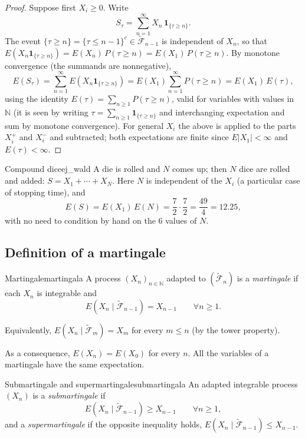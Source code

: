 \documentclass[11pt, a4paper]{article}
\begin{document}
\begin{proof}
Suppose first $X_i \ge 0$. Write
$$ S_\tau = \sum_{n=1}^\infty X_n \, \mathbf{1}_{\{\tau \ge n\}}. $$
The event $\{\tau \ge n\} = \{\tau \le n - 1\}^c \in \widetilde{\mathcal{F}}_{n-1}$ is
independent of $X_n$, so that
$E(X_n \mathbf{1}_{\{\tau \ge n\}}) = E(X_n) \, P(\tau \ge n) = E(X_1) \, P(\tau \ge n)$. By
monotone convergence (the summands are nonnegative),
$$ E(S_\tau) = \sum_{n=1}^\infty E(X_n \mathbf{1}_{\{\tau \ge n\}}) = E(X_1)
\sum_{n=1}^\infty P(\tau \ge n) = E(X_1) \, E(\tau), $$
using the identity $E(\tau) = \sum_{n \ge 1} P(\tau \ge n)$, valid for variables with values
in $\mathbb{N}$ (it is seen by writing $\tau = \sum_{n \ge 1} \mathbf{1}_{\{\tau \ge n\}}$ and
interchanging expectation and sum by monotone convergence). For general $X_i$ the above is applied
to the parts $X_i^+$ and $X_i^-$ and subtracted; both expectations are finite since
$E|X_1| < \infty$ and $E(\tau) < \infty$.
\end{proof}

\begin{ejemplo}{Compound dice}{ej_wald}
A die is rolled and $N$ comes up; then $N$ dice are rolled and added: $S = X_1 + \cdots + X_N$. Here
$N$ is independent of the $X_i$ (a particular case of stopping time), and
$$ E(S) = E(X_1) \, E(N) = \frac{7}{2} \cdot \frac{7}{2} = \frac{49}{4} = 12.25, $$
with no need to condition by hand on the $6$ values of $N$.
\end{ejemplo}

\subsection{Definition of a martingale}

\begin{definicion}{Martingale}{martingala}
A process $(X_n)_{n \in \mathbb{N}}$ adapted to $(\widetilde{\mathcal{F}}_n)$ is a
\emph{martingale} if each $X_n$ is integrable and
$$ E(X_n \mid \widetilde{\mathcal{F}}_{n-1}) = X_{n-1} \qquad \forall n \ge 1. $$
\end{definicion}

\obs Equivalently, $E(X_n \mid \widetilde{\mathcal{F}}_m) = X_m$ for every $m \le n$ (by
the tower property).

\obs As a consequence, $E(X_n) = E(X_0)$ for every $n$. All the variables of a martingale
have the same expectation.

\begin{definicion}{Submartingale and supermartingale}{submartingala}
An adapted integrable process $(X_n)$ is a \emph{submartingale} if
$$ E(X_n \mid \widetilde{\mathcal{F}}_{n-1}) \ge X_{n-1} \qquad \forall n \ge 1, $$
and a \emph{supermartingale} if the opposite inequality holds,
$E(X_n \mid \widetilde{\mathcal{F}}_{n-1}) \le X_{n-1}$.
\end{definicion}
\end{document}
